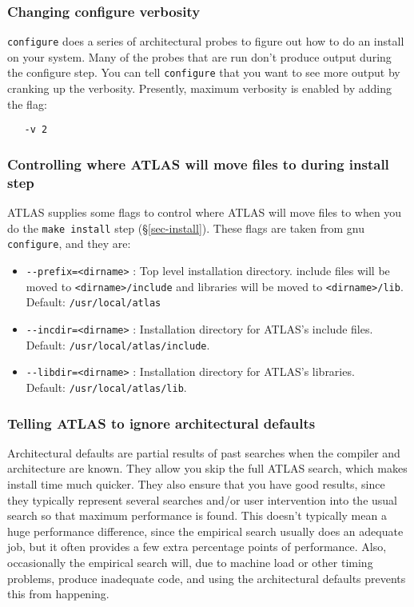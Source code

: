 \documentclass[11pt]{article}
\begin{document}
\subsubsection{Changing configure verbosity}
\label{sec-verb}
{\tt configure} does a series of architectural probes to figure out how to do
an install on your system.  Many of the probes that are run don't produce
output during the configure step.  You can tell {\tt configure} that you want
to see more output by cranking up the verbosity.  Presently, maximum 
verbosity is enabled by adding the flag:
\vspace*{-0.1in}
\begin{verbatim}
   -v 2
\end{verbatim}

\subsubsection{Controlling where ATLAS will move files to during install step}
ATLAS supplies some flags to control where ATLAS will move files to when
you do the {\tt make install} step (\S\ref{sec-install}).  These flags
are taken from gnu {\tt configure}, and they are:
\begin{itemize}
\item \verb|--prefix=<dirname>| : Top level installation directory.
      include files will be moved to \verb|<dirname>/include| and
      libraries will be moved to \verb|<dirname>/lib|.
      Default: {\tt /usr/local/atlas}
\item \verb|--incdir=<dirname>| : Installation directory for ATLAS's
      include files.  Default: {\tt /usr/local/atlas/include}.
\item \verb|--libdir=<dirname>| : Installation directory for ATLAS's
      libraries. \\ Default: {\tt /usr/local/atlas/lib}.
\end{itemize}

\subsubsection{Telling ATLAS to ignore architectural defaults}
\label{sec-nodefaults}
Architectural defaults are partial results of past searches when
the compiler and architecture are known.  They allow you skip the
full ATLAS search, which makes install time much quicker.  They also
ensure that you have good results, since they typically represent
several searches and/or user intervention into the usual search so
that maximum performance is found.  This doesn't typically mean a huge
performance difference, since the empirical search usually does an adequate
job, but it often provides a few extra percentage points of performance.  Also,
occasionally the empirical search will, due to machine load or other timing
problems, produce inadequate code, and using the architectural defaults
prevents this from happening.
\end{document}

